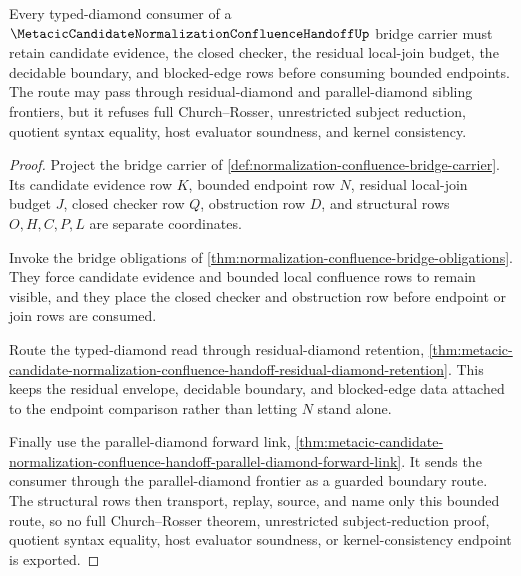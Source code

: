 \begin{theorem}
\label{thm:metacic-candidate-normalization-confluence-handoff-typed-diamond-route}
Every typed-diamond consumer of a $\MetacicCandidateNormalizationConfluenceHandoffUp$ bridge carrier must retain candidate evidence, the closed checker, the residual local-join budget, the decidable boundary, and blocked-edge rows before consuming bounded endpoints. The route may pass through residual-diamond and parallel-diamond sibling frontiers, but it refuses full Church--Rosser, unrestricted subject reduction, quotient syntax equality, host evaluator soundness, and kernel consistency.
\end{theorem}
\begin{proof}
Project the bridge carrier of \autoref{def:normalization-confluence-bridge-carrier}. Its candidate evidence row $K$, bounded endpoint row $N$, residual local-join budget $J$, closed checker row $Q$, obstruction row $D$, and structural rows $O,H,C,P,L$ are separate coordinates.

Invoke the bridge obligations of \autoref{thm:normalization-confluence-bridge-obligations}. They force candidate evidence and bounded local confluence rows to remain visible, and they place the closed checker and obstruction row before endpoint or join rows are consumed.

Route the typed-diamond read through residual-diamond retention, \autoref{thm:metacic-candidate-normalization-confluence-handoff-residual-diamond-retention}. This keeps the residual envelope, decidable boundary, and blocked-edge data attached to the endpoint comparison rather than letting $N$ stand alone.

Finally use the parallel-diamond forward link, \autoref{thm:metacic-candidate-normalization-confluence-handoff-parallel-diamond-forward-link}. It sends the consumer through the parallel-diamond frontier as a guarded boundary route. The structural rows then transport, replay, source, and name only this bounded route, so no full Church--Rosser theorem, unrestricted subject-reduction proof, quotient syntax equality, host evaluator soundness, or kernel-consistency endpoint is exported.
\end{proof}
